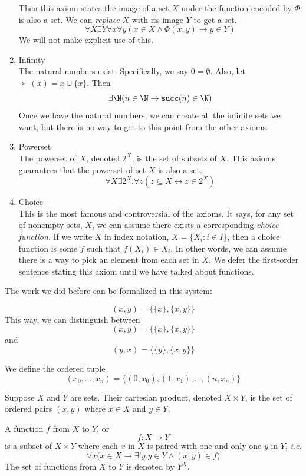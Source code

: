 \documentclass{scrbook}
\renewcommand{\implies}{\to}
\renewcommand{\iff}{\leftrightarrow}
\newcommand{\ie}{\emph{i.e.}\xspace}
\begin{document}
\begin{enumerate}
  Then this axiom states the image of a set $X$ under the function encoded by $\Phi$ is also a set. We can \emph{replace} $X$ with its image $Y$ to get a set.
  \[
  \forall X \exists Y \forall x \forall y (x\in X \wedge \Phi(x,y) \implies y\in Y)
  \]
  We will not make explicit use of this. 
\item Infinity \\
  The natural numbers exist. Specifically, we say $0=\emptyset$. Also, let $\succ(x)=x\cup \{x\}$. Then
  \[
  \exists \N (n\in \N\implies \succ(n)\in\N)
  \]
  Once we have the natural numbers, we can create all the infinite sets we want, but there is no way to get to this point from the other \zfc axioms. 
\item Powerset \\
  The powerset of $X$, denoted $2^X$, is the set of subsets of $X$. This axioms guarantees that the powerset of set $X$ is also a set. 
  \[
  \forall X \exists 2^X . \forall z (z\subseteq X \iff z \in 2^X)
  \]
\item Choice \\
This is the most famous and controversial of the \zfc axioms. It says, for any set of nonempty sets, $X$, we can assume there exists a corresponding \emph{choice function}. If we write $X$ in index notation, $X=\{X_i:i\in I\}$, then a choice function is some $f$ such that $f(X_i)\in X_i$. In other words, we can assume there is a way to pick an element from each set in $X$. We defer the first-order sentence stating this axiom until we have talked about functions.  
 \label{zfc:choice}
\end{enumerate}
The work we did before can be formalized in this system:
\begin{defn}
 \[(x,y)=\{\{x\},\{x,y\}\}\]
 This way, we can distinguish between
 \[
 (x,y)=\{\{x\},\{x,y\}\}
 \]
 and
 \[
 (y,x)=\{\{y\},\{x,y\}\}
 \]
\end{defn}
\begin{defn}
  We define the ordered tuple
  \[
  (x_0,\dots,x_n)= \{(0,x_0),(1,x_1),\dots,(n,x_n)\}
  \]
\end{defn}

\begin{defn}
  Suppose $X$ and $Y$ are sets. Their cartesian product, denoted $X\times Y$, is the set of ordered pairs $(x,y)$ where $x\in X$ and $y\in Y$. 
\end{defn}

\begin{defn}[function]
  A function $f$ from $X$ to $Y$, or 
  \[
  f: X\to Y
  \]
  is a subset of $X\times Y$ where each $x$ in $X$ is paired with one and only one $y$ in $Y$, \ie
  \[
  \forall x \bigl(x\in X \implies\exists! y. y\in Y \wedge (x,y)\in f\bigr)
  \]
  The set of functions from $X$ to $Y$ is denoted by  $Y^X$. 
\end{defn}
\end{document}
